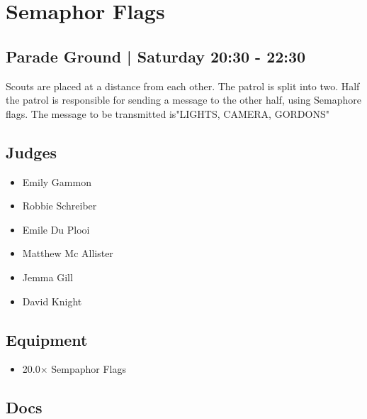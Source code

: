 \documentclass[10pt]{article}
\begin{document}
		\begin{minipage}{\linewidth}
		\setcounter{section}{21}
	\section{Semaphor Flags }
	\subsection*{Parade Ground | Saturday 20:30 - 22:30}

	Scouts are placed at a distance from each other. The patrol is split into two. Half the patrol is responsible for sending a message to the other half, using Semaphore flags. The message to be transmitted is"LIGHTS, CAMERA, GORDONS"

	\begin{multicols}{2}
	\subsection*{\faUsers \: Judges}
	\begin{itemize}
			\item Emily Gammon
			\item Robbie Schreiber
			\item Emile Du Plooi
			\item Matthew Mc Allister
			\item Jemma Gill
			\item David Knight
		\end{itemize}
	\columnbreak
	\subsection*{\faWrench \: Equipment}
	
        \begin{itemize}
                    \item 20.0$\times$ \: Sempaphor Flags
                \end{itemize}
                \vfill\null
        \subsection*{\faFile \: Docs}
     	\end{multicols}


	\vspace{1cm}
	\end{minipage}
\end{document}

